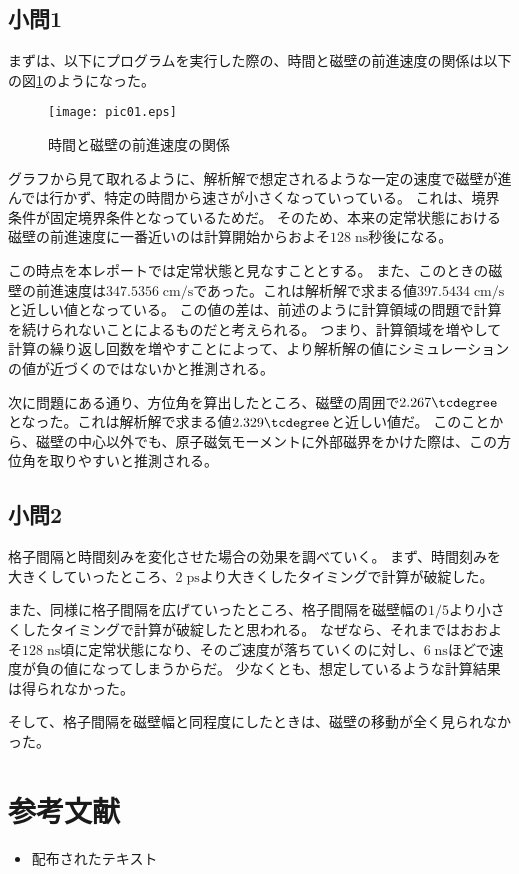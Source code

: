 \documentclass{jsarticle}
\begin{document}
\subsection{小問1}
まずは、以下にプログラムを実行した際の、時間と磁壁の前進速度の関係は以下の図\ref{fig01}のようになった。
\begin{figure}[H]
	\centering
	\texttt{[image: pic01.eps]}
	\caption{時間と磁壁の前進速度の関係}
	\label{fig01}
\end{figure}

グラフから見て取れるように、解析解で想定されるような一定の速度で磁壁が進んでは行かず、特定の時間から速さが小さくなっていっている。
これは、境界条件が固定境界条件となっているためだ。
そのため、本来の定常状態における磁壁の前進速度に一番近いのは計算開始からおよそ$128\;\mathrm{ns}$秒後になる。

この時点を本レポートでは定常状態と見なすこととする。
また、このときの磁壁の前進速度は$347.5356\;\mathrm{cm/s}$であった。これは解析解で求まる値$397.5434\;\mathrm{cm/s}$と近しい値となっている。
この値の差は、前述のように計算領域の問題で計算を続けられないことによるものだと考えられる。
つまり、計算領域を増やして計算の繰り返し回数を増やすことによって、より解析解の値にシミュレーションの値が近づくのではないかと推測される。

次に問題にある通り、方位角を算出したところ、磁壁の周囲で$2.267\tcdegree$となった。これは解析解で求まる値$2.329\tcdegree$と近しい値だ。
このことから、磁壁の中心以外でも、原子磁気モーメントに外部磁界をかけた際は、この方位角を取りやすいと推測される。

\subsection{小問2}
格子間隔と時間刻みを変化させた場合の効果を調べていく。
まず、時間刻みを大きくしていったところ、$2\;\mathrm{ps}$より大きくしたタイミングで計算が破綻した。

また、同様に格子間隔を広げていったところ、格子間隔を磁壁幅の$1/5$より小さくしたタイミングで計算が破綻したと思われる。
なぜなら、それまではおおよそ$128\;\mathrm{ns}$頃に定常状態になり、そのご速度が落ちていくのに対し、$6\;\mathrm{ns}$ほどで速度が負の値になってしまうからだ。
少なくとも、想定しているような計算結果は得られなかった。

そして、格子間隔を磁壁幅と同程度にしたときは、磁壁の移動が全く見られなかった。

\section{参考文献}

\begin{itemize}
  \item 配布されたテキスト
\end{itemize}
\end{document}
